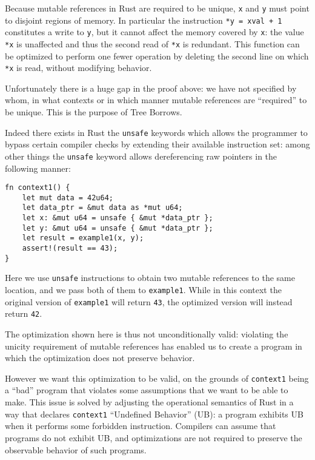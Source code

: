 \documentclass[a4paper,11pt]{article}
\theoremstyle{plain}
\theoremstyle{definition}
\theoremstyle{remark}
\begin{document}
Because mutable references in Rust are required to be unique, \texttt{x} and
\texttt{y} must point to disjoint regions of memory. In particular the
instruction \texttt{*y = xval + 1} constitutes a write to \texttt{y}, but it
cannot affect the memory covered by \texttt{x}: the value \texttt{*x} is unaffected
and thus the second read of \texttt{*x} is redundant. This function can be
optimized to perform one fewer operation by deleting the second line on which
\texttt{*x} is read, without modifying behavior.

Unfortunately there is a huge gap in the proof above: we have not specified
by whom, in what contexts or in which manner mutable references are ``required''
to be unique. This is the purpose of Tree Borrows.

Indeed there exists in Rust the \texttt{unsafe} keywords which
allows the programmer to bypass certain compiler checks by extending their
available instruction set: among other things the \texttt{unsafe} keyword allows
dereferencing raw pointers in the following manner:
\begin{lstlisting}
fn context1() {
    let mut data = 42u64;
    let data_ptr = &mut data as *mut u64;
    let x: &mut u64 = unsafe { &mut *data_ptr };
    let y: &mut u64 = unsafe { &mut *data_ptr };
    let result = example1(x, y);
    assert!(result == 43);
}
\end{lstlisting}
Here we use \texttt{unsafe} instructions to obtain two mutable references
to the same location, and we pass both of them to \texttt{example1}.
While in this context the original version of \texttt{example1} will return
\texttt{43}, the optimized version will instead return \texttt{42}.

The optimization shown here is thus not unconditionally valid: violating the
unicity requirement of mutable references has enabled us to create a program
in which the optimization does not preserve behavior.

However we want this optimization to be valid, on the grounds of \texttt{context1}
being a ``bad'' program that violates some assumptions that we want to be able
to make. This issue is solved by adjusting the operational semantics of Rust
in a way that declares \texttt{context1} ``Undefined Behavior'' (UB):
a program exhibits UB when it performs some forbidden instruction.
Compilers can assume that programs do not exhibit UB, and optimizations are
not required to preserve the observable behavior of such programs.
\end{document}
